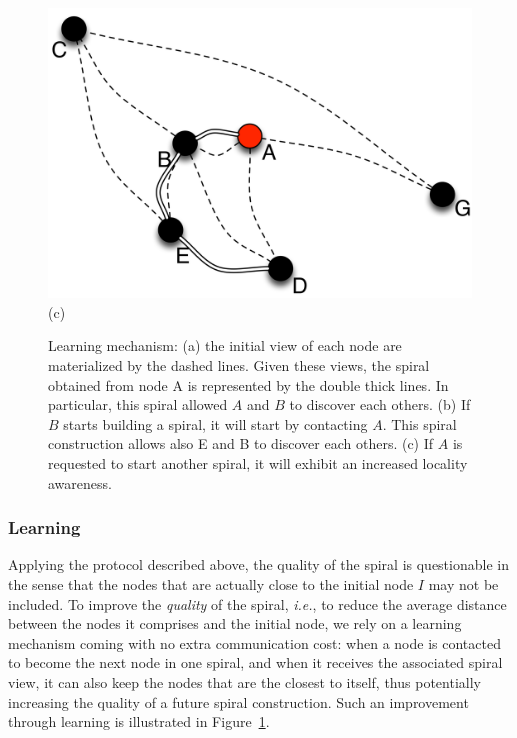 \begin{figure}[ht]
{\begin{center}
{\begin{minipage}{.3\linewidth}
\begin{center}
	  \end{center}
	\end{minipage}
        ~
	\begin{minipage}{.3\linewidth}
	  \begin{center}
	    \includegraphics[width=1.05\linewidth]{Figures/learning3.png}\\(c)
	  \end{center}
	\end{minipage}
	\caption{Learning mechanism: (a) the initial view of each node are materialized by
          the dashed lines. Given these views, the spiral obtained from node A is
          represented by the double thick lines. In particular, this spiral allowed $A$
          and $B$ to discover each others. (b) If $B$ starts building a spiral, it will
          start by contacting $A$. This spiral construction allows also E and B to
          discover each others. (c) If $A$ is requested to start another spiral, it will
          exhibit an increased locality awareness.\label{fig:learning}} }
      \end{center}
}
\end{figure}

\subsubsection*{Learning}

Applying the protocol described above, the quality of the spiral is questionable in the
sense that the nodes that are actually close to the initial node $I$ may not be
included.%
%
To improve the \emph{quality} of the spiral, \emph{i.e.}, to reduce the average distance
between the nodes it comprises and the initial node, we rely on a learning mechanism
coming with no extra communication cost: when a node is contacted to become the next node
in one spiral, and when it receives the associated spiral view, it can also keep the nodes
that are the closest to itself, thus potentially increasing the quality of a future spiral
construction. Such an improvement through learning is illustrated in
Figure~\ref{fig:learning}.

